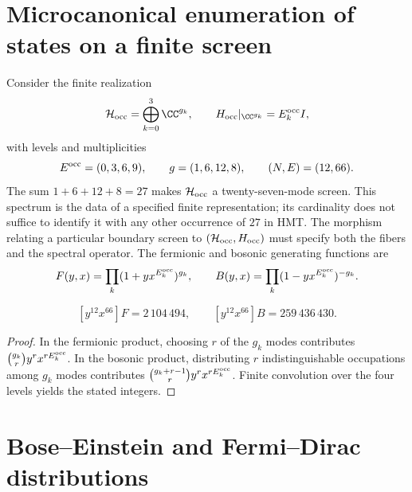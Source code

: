 \section{Microcanonical enumeration of states on a finite screen}
\label{v:rec:ocupacion:section:01}

Consider the finite realization
\[
 \mathcal H_{\rm occ}=\bigoplus_{k=0}^{3}\CC^{g_k},
 \qquad
 H_{\rm occ}|_{\CC^{g_k}}=E_k^{\rm occ} I,
\]
with levels and multiplicities
\[
 E^{\rm occ}=(0,3,6,9),\qquad g=(1,6,12,8),
 \qquad(N,E)=(12,66).
\]
The sum \(1+6+12+8=27\) makes \(\mathcal H_{\rm occ}\) a
twenty-seven-mode screen. This spectrum is the data of a specified finite
representation; its cardinality does not suffice to identify it with any other
occurrence of \(27\) in HMT\@. The morphism relating a particular
boundary screen to \((\mathcal H_{\rm occ},H_{\rm occ})\) must specify both
the fibers and the spectral operator.
The fermionic and bosonic generating functions are
\[
 F(y,x)=\prod_k(1+yx^{E_k^{\rm occ}})^{g_k},
 \qquad
 B(y,x)=\prod_k(1-yx^{E_k^{\rm occ}})^{-g_k}.
\]

\begin{proposition}
\label{v:rec:prop:cardinalidades-microcanonicas}
\[
 [y^{12}x^{66}]F=2\,104\,494,
 \qquad
 [y^{12}x^{66}]B=259\,436\,430.
\]
\end{proposition}
\begin{proof}
In the fermionic product, choosing \(r\) of the \(g_k\) modes contributes
\(\binom{g_k}{r}y^rx^{rE_k^{\rm occ}}\). In the bosonic product, distributing \(r\)
indistinguishable occupations among \(g_k\) modes contributes
\(\binom{g_k+r-1}{r}y^rx^{rE_k^{\rm occ}}\). Finite convolution over the
four levels yields the stated integers.
\end{proof}

\section{Bose--Einstein and Fermi--Dirac distributions}
\begingroup\fontsize{10}{11.5}\selectfont\setlength{\parskip}{1.5pt}
\setlength{\abovedisplayskip}{3pt}\setlength{\belowdisplayskip}{3pt}
\setlength{\abovedisplayshortskip}{2pt}\setlength{\belowdisplayshortskip}{2pt}
\label{v:rec:ocupacion:section:02}

